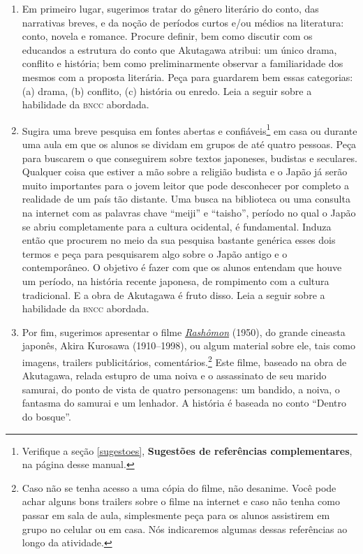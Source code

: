 \documentclass[12pt]{extarticle}
\begin{document}
\begin{enumerate} 
\item Em primeiro lugar, sugerimos tratar do gênero literário
do conto,  das narrativas breves, e da noção de períodos curtos e/ou
médios na literatura: conto, novela e romance. Procure definir, bem como
discutir com os educandos a estrutura do conto que Akutagawa atribui: um
único drama, conflito e história; bem como preliminarmente observar a
familiaridade dos mesmos com a proposta literária. Peça para guardarem
bem essas categorias: (a) drama, (b) conflito, (c) história ou enredo.
Leia a seguir sobre a habilidade da \textsc{bncc} abordada.


\item Sugira uma breve pesquisa em fontes abertas e confiáveis\footnote{Verifique 
a seção \ref{sugestoes}, \textbf{Sugestões de referências complementares}, 
na página \pageref{sugestoes} desse manual.} 
em casa ou durante uma aula em que os alunos se
dividam em grupos de até quatro pessoas. 
Peça para buscarem o que conseguirem
sobre textos japoneses, budistas e seculares.
Qualquer coisa que estiver a
mão sobre a religião budista e o Japão já serão muito importantes para o
jovem leitor que pode desconhecer por completo a realidade de um país tão
distante. Uma busca na biblioteca ou uma consulta na internet com as
palavras chave ``meiji'' e ``taisho'', período no qual o Japão se abriu
completamente para a cultura ocidental, é fundamental. Induza então que
procurem no meio da sua pesquisa bastante genérica esses dois termos e peça
para pesquisarem algo sobre o Japão antigo e o contemporâneo. O objetivo é
fazer com que os alunos entendam que houve um período, na história recente
japonesa, de rompimento com a cultura tradicional. E a obra de Akutagawa é
fruto disso. Leia a seguir sobre a habilidade da \textsc{bncc} abordada.

\item Por fim, sugerimos apresentar o filme
\href{https://www.youtube.com/watch?v=xCZ9TguVOIA}{\textit{Rashômon}} (1950),
do grande cineasta japonês, Akira Kurosawa (1910--1998), ou algum material
sobre ele, tais como imagens, trailers publicitários,
comentários.\footnote{Caso não se tenha acesso a uma cópia do filme, não
desanime. Você pode achar alguns bons trailers sobre o filme na internet e
caso não tenha como passar em sala de aula, simplesmente peça para os
alunos assistirem em grupo no celular ou em casa.  Nós indicaremos algumas
dessas referências ao longo da atividade.} Este filme, baseado na obra de
Akutagawa, relada estupro de uma noiva e o assassinato de seu marido
samurai, do ponto de vista de quatro personagens: um bandido, a noiva, o
fantasma do samurai e um lenhador.  A história é baseada no conto ``Dentro do
bosque''.  

\end{enumerate}
\end{document}
